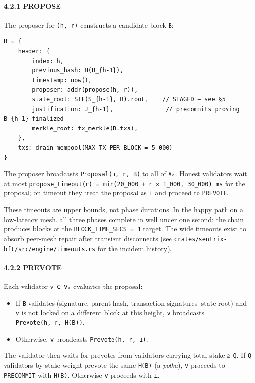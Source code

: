 \documentclass[11pt,a4paper]{article}
\providecommand{\tightlist}{\setlength{\itemsep}{0pt}\setlength{\parskip}{0pt}}
\begin{document}
\hypertarget{421-propose}{%
\paragraph{4.2.1 PROPOSE}\label{421-propose}}

The proposer for \texttt{(h,\ r)} constructs a candidate block
\texttt{B}:

\begin{verbatim}
B = {
    header: {
        index: h,
        previous_hash: H(B_{h-1}),
        timestamp: now(),
        proposer: addr(propose(h, r)),
        state_root: STF(S_{h-1}, B).root,    // STAGED — see §5
        justification: J_{h-1},               // precommits proving B_{h-1} finalized
        merkle_root: tx_merkle(B.txs),
    },
    txs: drain_mempool(MAX_TX_PER_BLOCK = 5_000)
}
\end{verbatim}

The proposer broadcasts \texttt{Proposal(h,\ r,\ B)} to all of
\texttt{Vₐ}. Honest validators wait at most
\texttt{propose\_timeout(r)\ =\ min(20\_000\ +\ r\ ×\ 1\_000,\ 30\_000)\ ms}
for the proposal; on timeout they treat the proposal as \texttt{⊥} and
proceed to \texttt{PREVOTE}.

These timeouts are upper bounds, not phase durations. In the happy path
on a low-latency mesh, all three phases complete in well under one
second; the chain produces blocks at the
\texttt{BLOCK\_TIME\_SECS\ =\ 1} target. The wide timeouts exist to
absorb peer-mesh repair after transient disconnects (see
\texttt{crates/sentrix-bft/src/engine/timeouts.rs} for the incident
history).

\hypertarget{422-prevote}{%
\paragraph{4.2.2 PREVOTE}\label{422-prevote}}

Each validator \texttt{v\ ∈\ Vₐ} evaluates the proposal:

\begin{itemize}
\tightlist
\item
  If \texttt{B} validates (signature, parent hash, transaction
  signatures, state root) and \texttt{v} is not locked on a different
  block at this height, \texttt{v} broadcasts
  \texttt{Prevote(h,\ r,\ H(B))}.
\item
  Otherwise, \texttt{v} broadcasts \texttt{Prevote(h,\ r,\ ⊥)}.
\end{itemize}

The validator then waits for prevotes from validators carrying total
stake ≥ \texttt{Q}. If \texttt{Q} validators by stake-weight prevote the
same \texttt{H(B)} (a \emph{polka}), \texttt{v} proceeds to
\texttt{PRECOMMIT} with \texttt{H(B)}. Otherwise \texttt{v} proceeds
with \texttt{⊥}.
\end{document}
